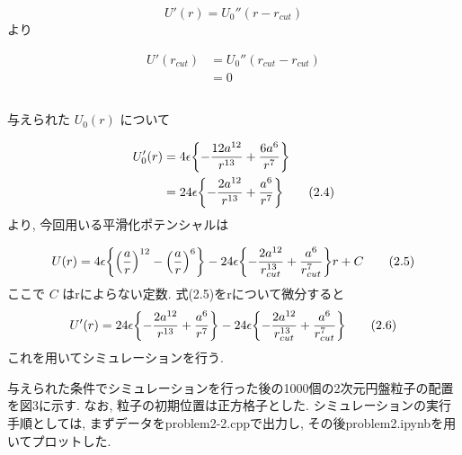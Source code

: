 \documentclass[a4paper,dvipdfmx]{jarticle}
\begin{document}
\begin{equation}
    U'(r) = U_0''(r - r_{cut}) \tag{2.2}
\end{equation}
より

\begin{align*}
    U'(r_{cut}) &= U_0''(r_{cut} - r_{cut}) \\
    &= 0 \tag{2.3}
\end{align*}

\subsection{}
\noindent
与えられた $U_0(r)$ について

\begin{align*}
    U_0'(r) &= 4 \epsilon \qty{-\frac{12a^{12}}{r^{13}} + \frac{6a^6}{r^7}} \\ 
    &= 24 \epsilon \qty{-\frac{2a^{12}}{r^{13}} + \frac{a^6}{r^7}} \tag{2.4}
\end{align*}
より, 今回用いる平滑化ポテンシャルは

\begin{equation}
    U(r) = 4 \epsilon \qty{\qty(\frac{a}{r})^{12} - \qty(\frac{a}{r})^6}
    - 24 \epsilon \qty{-\frac{2a^{12}}{r_{cut}^{13}} + \frac{a^6}{r_{cut}^7}} r
    + C \tag{2.5}
\end{equation}
ここで $C$ はrによらない定数. 
式(2.5)をrについて微分すると
\begin{equation}
    U'(r) = 24 \epsilon \qty{-\frac{2a^{12}}{r^{13}} + \frac{a^6}{r^7}}
    - 24 \epsilon \qty{-\frac{2a^{12}}{r_{cut}^{13}} + \frac{a^6}{r_{cut}^7}} 
    \tag{2.6}
\end{equation}
これを用いてシミュレーションを行う.

\noindent
与えられた条件でシミュレーションを行った後の1000個の2次元円盤粒子の配置を図3に示す.
なお, 粒子の初期位置は正方格子とした.
シミュレーションの実行手順としては, まずデータをproblem2-2.cppで出力し, 
その後problem2.ipynbを用いてプロットした.
\end{document}
